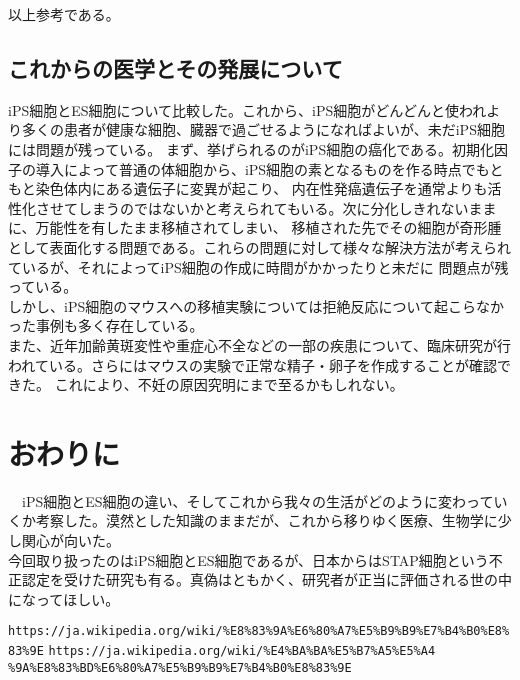 \documentclass[uplatex, titlepage]{jsarticle}
\begin{document}
以上参考である。

\subsection{これからの医学とその発展について}

  iPS細胞とES細胞について比較した。これから、iPS細胞がどんどんと使われより多くの患者が健康な細胞、臓器で過ごせるようになればよいが、未だiPS細胞には問題が残っている。
  まず、挙げられるのがiPS細胞の癌化である。初期化因子の導入によって普通の体細胞から、iPS細胞の素となるものを作る時点でもともと染色体内にある遺伝子に変異が起こり、
  内在性発癌遺伝子を通常よりも活性化させてしまうのではないかと考えられてもいる。次に分化しきれないままに、万能性を有したまま移植されてしまい、
  移植された先でその細胞が奇形腫として表面化する問題である。これらの問題に対して様々な解決方法が考えられているが、それによってiPS細胞の作成に時間がかかったりと未だに
  問題点が残っている。\\
  しかし、iPS細胞のマウスへの移植実験については拒絶反応について起こらなかった事例も多く存在している。\\
  また、近年加齢黄斑変性や重症心不全などの一部の疾患について、臨床研究が行われている。さらにはマウスの実験で正常な精子・卵子を作成することが確認できた。
  これにより、不妊の原因究明にまで至るかもしれない。\\

\section{おわりに}

　iPS細胞とES細胞の違い、そしてこれから我々の生活がどのように変わっていくか考察した。漠然とした知識のままだが、これから移りゆく医療、生物学に少し関心が向いた。\\
  今回取り扱ったのはiPS細胞とES細胞であるが、日本からはSTAP細胞という不正認定を受けた研究も有る。真偽はともかく、研究者が正当に評価される世の中になってほしい。\\

\begin{thebibliography}{99}
   \verb+https://ja.wikipedia.org/wiki/%E8%83%9A%E6%80%A7%E5%B9%B9%E7%B4%B0%E8%83%9E+
   \verb+https://ja.wikipedia.org/wiki/%E4%BA%BA%E5%B7%A5%E5%A4+\\
  \verb+%9A%E8%83%BD%E6%80%A7%E5%B9%B9%E7%B4%B0%E8%83%9E+

\end{thebibliography}
\end{document}
